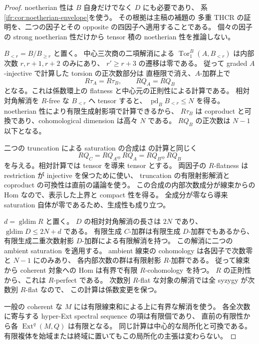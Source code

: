 \begin{proof}
noetherian 性は $B$ 自身だけでなく $D$ にも必要であり、
系\ref{ifr:cor:noetherian-envelope}を使う。
その根拠は主稿の補題の
多重 THCR の証明を、二つの因子とその opposite の四因子へ適用することである。
個々の因子の strong noetherian 性だけから tensor 積の noetherian 性を推論しない。

$B_{<r}=B/B_{\geq r}$ と置く。
中心三次商の二項解消による
$\operatorname{Tor}_1^B(A,B_{<r})$ は内部次数 $r,r+1,r+2$ のみにあり、
$r'\geq r+3$ の遷移は零である。
従って graded $A$-injective で計算した torsion の正次数部分は
直極限で消え、$A$-加群上で
\begin{equation}\label{iff:eq:torsion-independence}
 R\tau_A=R\tau_B,\qquad RQ_A=RQ_B
\end{equation}
となる。これは係数環上の flatness と中心元の正則性による計算である。
相対対角解消を $R$-free な $B_{<r}$ へ tensor すると、
$\operatorname{pd}_B B_{<r}\leq N$ を得る。
noetherian 性により有限生成射影項で計算できるから、
$R\tau_B$ は coproduct と可換であり、cohomological dimension は高々 $N$ である。
$RQ_B$ の正次数は $N-1$ 以下となる。

二つの truncation による saturation の合成は
\cite[Proposition~3.41]{CMOBallardFarman} の計算と同じく
\[
 RQ_C=RQ_{A^{\mathrm{op}}}\,RQ_A
       =RQ_{B^{\mathrm{op}}}\,RQ_B
\]
を与える。相対計算では tensor を導来 tensor とする。
両因子の $R$-flatness は restriction が injective を保つために使い、
truncation の有限射影解消と coproduct の可換性は直前の議論を使う。
この合成の内部次数成分が線束からの Hom なので、表示した上界と compact 性を得る。
全成分が零なら導来 saturation 自体が零であるため、生成性も成り立つ。

$d=\operatorname{gldim}R$ と置く。
$D$ の相対対角解消の長さは $2N$ であり、
$\operatorname{gldim}D\leq2N+d$ である。
有限生成 $C$-加群は有限生成 $D$-加群でもあるから、
有限生成二重次数射影 $D$-加群による有限解消を持つ。
この解消に二つの ambient saturation を適用する。
ambient 線束の cohomology は各因子で次数零と $N-1$ にのみあり、
各内部次数の群は有限射影 $R$-加群である。
従って線束から coherent 対象への Hom は有界で有限 $R$-cohomology を持つ。
$R$ の正則性から、これは $R$-perfect である。
次数別 $R$-flat な対象の解消では全 syzygy が次数別 $R$-flat なので、
この計算は係数変更を保つ。

一般の coherent な $M$ には有限線束和による上に有界な解消を使う。
各全次数に寄与する hyper-Ext spectral sequence の項は有限個であり、
直前の有限性から各 $\operatorname{Ext}^q(M,Q)$ は有限となる。
同じ計算は中心的な局所化と可換である。
有限複体を始域または終域に置いてもこの局所化の主張は変わらない。
\end{proof}

